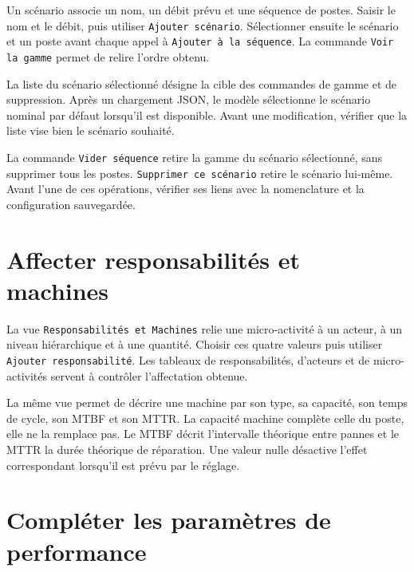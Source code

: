 Un scénario associe un nom, un débit prévu et une séquence de postes. Saisir le nom et le débit, puis utiliser \texttt{Ajouter scénario}. Sélectionner ensuite le scénario et un poste avant chaque appel à \texttt{Ajouter à la séquence}. La commande \texttt{Voir la gamme} permet de relire l'ordre obtenu.

La liste du scénario sélectionné désigne la cible des commandes de gamme et de suppression. Après un chargement JSON, le modèle sélectionne le scénario nominal par défaut lorsqu'il est disponible. Avant une modification, vérifier que la liste vise bien le scénario souhaité.

La commande \texttt{Vider séquence} retire la gamme du scénario sélectionné, sans supprimer tous les postes. \texttt{Supprimer ce scénario} retire le scénario lui-même. Avant l'une de ces opérations, vérifier ses liens avec la nomenclature et la configuration sauvegardée.


\section{Affecter responsabilités et machines}

La vue \texttt{Responsabilités et Machines} relie une micro-activité à un acteur, à un niveau hiérarchique et à une quantité. Choisir ces quatre valeurs puis utiliser \texttt{Ajouter responsabilité}. Les tableaux de responsabilités, d'acteurs et de micro-activités servent à contrôler l'affectation obtenue.

La même vue permet de décrire une machine par son type, sa capacité, son temps de cycle, son MTBF et son MTTR. La capacité machine complète celle du poste, elle ne la remplace pas. Le MTBF décrit l'intervalle théorique entre pannes et le MTTR la durée théorique de réparation. Une valeur nulle désactive l'effet correspondant lorsqu'il est prévu par le réglage.


\section{Compléter les paramètres de performance}

